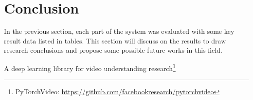 \chapter{Conclusion}
\label{chap:Conclusion}
In the previous section, each part of the system was evaluated with some key result data listed in tables.
This section will discuss on the results to draw research conclusions and propose some possible future works in this field.

A deep learning library for video understanding research\footnote{PyTorchVideo: \url{https://github.com/facebookresearch/pytorchvideo}}
